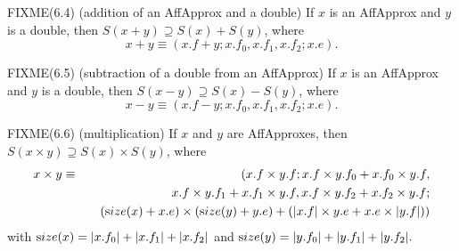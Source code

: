 \begin{proposition}{FIXME(6.4) {\textrm (addition of an AffApprox and a double)}} If $x$ is an {\textrm AffApprox}  and $y$ is a double{\textrm ,}
 then $S(x +
y)
\supseteq S(x) + S(y)${\textrm ,} where
$$x + y \equiv (x.f + y; x.f_0, x.f_1 , x.f_2 ; x.e).$$ 
\end{proposition}

\begin{proposition}{FIXME(6.5) {\textrm (subtraction of a double from an AffApprox)}}  If $x$ is an {\textrm AffApprox} and $y$ is a double{\textrm ,}
 then
$S(x - y)
\supseteq S(x) - S(y)${\textrm ,} where
$$x - y \equiv (x.f - y; x.f_0, x.f_1 , x.f_2 ; x.e).$$ 
\end{proposition}

\begin{proposition}{FIXME(6.6) {\textrm (multiplication)}}  If $x$ and $y$ are {\textrm AffApproxes,}
 then $S(x \times y) \supseteq S(x) \times
S(y)${\textrm ,} where
\begin{eqnarray*}
x \times y &\equiv& (x.f \times y.f; x.f \times y.f_0 + x.f_0 \times y.f, \\
&& \quad
x.f \times y.f_1 + x.f_1 \times y.f, x.f \times y.f_2 + x.f_2 \times y.f; 
\\
&& \quad
({\textrm size}(x) + x.e) \times ({\textrm size}(y) + y.e) + (|x.f| \times y.e + x.e \times |y.f|))
                                            \end{eqnarray*}
 with ${\textrm size}(x) = |x.f_0| + |x.f_1| + |x.f_2|$ and ${\textrm size}(y) = |y.f_0| + |y.f_1| + |y.f_2|.$
\end{proposition}

